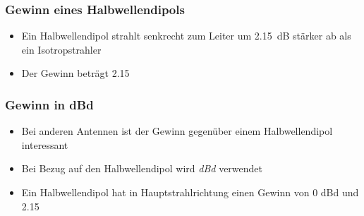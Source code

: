 \begin{frame}
\frametitle{Gewinn eines Halbwellendipols}
\begin{itemize}
  \item Ein Halbwellendipol strahlt senkrecht zum Leiter um \qty{2,15}{\dB} stärker ab als ein Isotropstrahler
  \item Der Gewinn beträgt \qty{2,15}{\dBi}
  \end{itemize}
\end{frame}

\begin{frame}
\frametitle{Gewinn in dBd}
\begin{itemize}
  \item Bei anderen Antennen ist der Gewinn gegenüber einem Halbwellendipol interessant
  \item Bei Bezug auf den Halbwellendipol wird \emph{dBd} verwendet
  \item Ein Halbwellendipol hat in Hauptstrahlrichtung einen Gewinn von 0 dBd und \qty{2,15}{\dBi}
  \end{itemize}
\end{frame}

\begin{frame}
\end{frame}%

